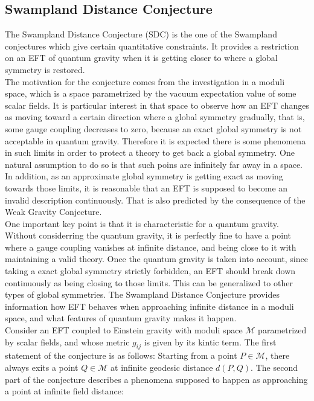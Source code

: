 \subsection{Swampland Distance Conjecture}
The Swampland Distance Conjecture (SDC) is the one of the Swampland conjectures which give certain quantitative constraints. It provides a restriction on an EFT of quantum gravity when it is getting closer to where a global symmetry is restored. \\
\indent The motivation for the conjecture comes from the investigation in a moduli space, which is a space parametrized by the vacuum expectation value of some scalar fields. It is particular interest in that space to observe how an EFT changes as moving toward a certain direction where a global symmetry gradually, that is, some gauge coupling decreases to zero, because an exact global symmetry is not acceptable in quantum gravity. Therefore it is expected there is some phenomena in such limits in order to protect a theory to get back a global symmetry. One natural assumption to do so is that such poins are infinitely far away in a space. In addition, as an approximate global symmetry is getting exact as moving towards those limits, it is reasonable that an EFT is supposed to become an invalid description continuously. That is also predicted by the consequence of the Weak Gravity Conjecture. \\
\indent One important key point is that it is characteristic for a quantum gravity. Without considerring the quantum gravity, it is perfectly fine to have a point where a gauge coupling vanishes at infinite distance, and being close to it with maintaining a valid theory. Once the quantum gravity is taken into account, since taking a exact global symmetry strictly forbidden, an EFT should break down continuously as being closing to those limits. This can be generalized to other types of global symmetries. The Swampland Distance Conjecture provides information how EFT behaves when approaching infinite distance in a moduli space, and what features of quantum gravity makes it happen. \\
\indent Consider an EFT coupled to Einstein gravity with moduli space $\mathcal{M}$ parametrized by scalar fields, and whose metric $g_{ij}$ is given by its kintic term. The first statement of the conjecture is as follows: Starting from a point $P \in \mathcal{M}$, there always exits a point $Q \in \mathcal{M}$ at infinite geodesic distance $d(P,Q)$. The second part of the conjecture describes a phenomena supposed to happen as approaching a point at infinite field distance:

